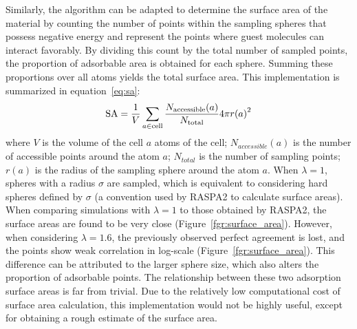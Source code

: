 \documentclass[main]{subfiles}
\begin{document}
Similarly, the algorithm can be adapted to determine the surface area of the material by counting the number of points within the sampling spheres that possess negative energy and represent the points where guest molecules can interact favorably. By dividing this count by the total number of sampled points, the proportion of adsorbable area is obtained for each sphere. Summing these proportions over all atoms yields the total surface area. This implementation is summarized in equation~\ref{eq:sa}:
\begin{equation}
\label{eq:sa}
    \textrm{SA} = \dfrac{1}{V}\sum_{a\in \textrm{cell}} \dfrac{N_{\text{accessible}}(a)}{N_{\text{total}}}4\pi {r(a)}^2
\end{equation}
where $V$ is the volume of the cell $a$ atoms of the cell; $N_{accessible}(a)$ is the number of accessible points around the atom $a$; $N_{total}$ is the number of sampling points; $r(a)$ is the radius of the sampling sphere around the atom $a$.
When $\lambda=1$, spheres with a radius $\sigma$ are sampled, which is equivalent to considering hard spheres defined by $\sigma$ (a convention used by RASPA2 to calculate surface areas). When comparing simulations with $\lambda=1$ to those obtained by RASPA2, the surface areas are found to be very close (Figure~\ref{fgr:surface_area}). However, when considering $\lambda=1.6$, the previously observed perfect agreement is lost, and the points show weak correlation in log-scale (Figure~\ref{fgr:surface_area}). This difference can be attributed to the larger sphere size, which also alters the proportion of adsorbable points. The relationship between these two adsorption surface areas is far from trivial. Due to the relatively low computational cost of surface area calculation, this implementation would not be highly useful, except for obtaining a rough estimate of the surface area.
\end{document}
